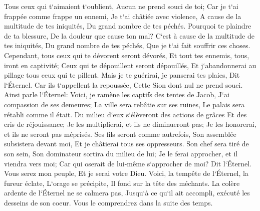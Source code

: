\verse Tous ceux qui t`aimaient t`oublient, Aucun ne prend souci de toi; Car je t`ai frappée comme frappe un ennemi, Je t`ai châtiée avec violence, A cause de la multitude de tes iniquités, Du grand nombre de tes péchés. 
\verse Pourquoi te plaindre de ta blessure, De la douleur que cause ton mal? C`est à cause de la multitude de tes iniquités, Du grand nombre de tes péchés, Que je t`ai fait souffrir ces choses. 
\verse Cependant, tous ceux qui te dévorent seront dévorés, Et tout tes ennemis, tous, iront en captivité; Ceux qui te dépouillent seront dépouillés, Et j`abandonnerai au pillage tous ceux qui te pillent. 
\verse Mais je te guérirai, je panserai tes plaies, Dit l`Éternel. Car ils t`appellent la repoussée, Cette Sion dont nul ne prend souci. 
\verse Ainsi parle l`Éternel: Voici, je ramène les captifs des tentes de Jacob, J`ai compassion de ses demeures; La ville sera rebâtie sur ses ruines, Le palais sera rétabli comme il était. 
\verse Du milieu d`eux s`élèveront des actions de grâces Et des cris de réjouissance; Je les multiplierai, et ils ne diminueront pas; Je les honorerai, et ils ne seront pas méprisés. 
\verse Ses fils seront comme autrefois, Son assemblée subsistera devant moi, Et je châtierai tous ses oppresseurs. 
\verse Son chef sera tiré de son sein, Son dominateur sortira du milieu de lui; Je le ferai approcher, et il viendra vers moi; Car qui oserait de lui-même s`approcher de moi? Dit l`Éternel. 
\verse Vous serez mon peuple, Et je serai votre Dieu. 
\verse Voici, la tempête de l`Éternel, la fureur éclate, L`orage se précipite, Il fond sur la tête des méchants. 
\verse La colère ardente de l`Éternel ne se calmera pas, Jusqu`à ce qu`il ait accompli, exécuté les desseins de son coeur. Vous le comprendrez dans la suite des temps. 

